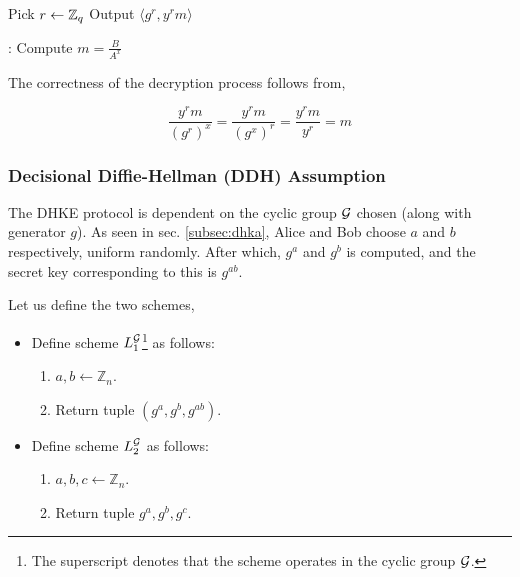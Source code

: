 \smallskip

\begin{algorithmic}
\STATE Pick $ r \leftarrow \mathbb{Z}_q $ 
\STATE Output $ \langle g^r, y^r m \rangle $ 
\end{algorithmic} 

\smallskip

\begin{algorithmic}
:
\STATE Compute $ m = \frac{B}{A^x} $ 
\end{algorithmic}

The correctness of the decryption process follows from,

\begin{equation*}
\frac{y^r m}{(g^r)^x} = \frac{y^r m}{(g^x)^r} = \frac{y^r m }{y^r} = m
\end{equation*}

\subsubsection{Decisional Diffie-Hellman (DDH) Assumption}

The DHKE protocol is dependent on the cyclic group \( \mathcal{G} \) chosen (along with generator \( g \)).
As seen in sec. \ref{subsec:dhka}, Alice and Bob choose \( a \) and \( b \) respectively, uniform randomly. 
After which, \( g^a \) and \( g^b \) is computed, and the secret key corresponding to this is \( g^{ab} \).

Let us define the two schemes,
\begin{itemize}
    \item Define scheme \( L_1^{\mathcal{G}} \)\footnote{The superscript denotes that the scheme operates in the cyclic group \( \mathcal{G} \).} as follows: 
    \begin{enumerate}
        \item \( a, b \leftarrow \mathbb{Z}_n \).
        \item Return tuple \( (g^a, g^b, g^{ab}) \).
    \end{enumerate}

    \item Define scheme \( L_2^{\mathcal{G}} \) as follows: 
    \begin{enumerate}
        \item \( a, b, c \leftarrow \mathbb{Z}_n \).
        \item Return tuple \( g^a, g^b, g^c \).
    \end{enumerate}
\end{itemize}


